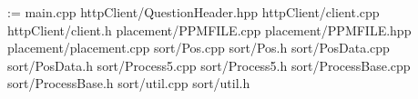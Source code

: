 \documentclass[a4j]{jarticle}
\begin{document}
\setlength{\columnsep}{40pt}
\begin{landscape}
 \begin{multicols}{2}


  \makeatletter
  \@tfor\xx@t:=
  {main.cpp}
  {httpClient/QuestionHeader.hpp}
  {httpClient/client.cpp}
  {httpClient/client.h}
  {placement/PPMFILE.cpp}
  {placement/PPMFILE.hpp}
  {placement/placement.cpp}
  {sort/Pos.cpp}
  {sort/Pos.h}
  {sort/PosData.cpp}
  {sort/PosData.h}
  {sort/Process5.cpp}
  {sort/Process5.h}
  {sort/ProcessBase.cpp}
  {sort/ProcessBase.h}
  {sort/util.cpp}
  {sort/util.h}
  \makeatother
 \end{multicols}
\end{landscape}
\end{document}
